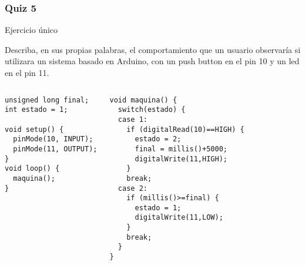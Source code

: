 \documentclass{beamer}
\begin{document}
\begin{frame}[fragile=singleslide]\frametitle{Quiz 5}

\begin{block}{Ejercicio único}
\begin{small}
Describa, en sus propias palabras, el comportamiento que un usuario observaría si utilizara un sistema basado en Arduino, con un push button en el pin 10 y un led en el pin 11.
\end{small}
\end{block}

\vspace{-0.3in}
\begin{columns}[t]

\begin{scriptsize}
\begin{verbatim}
unsigned long final;
int estado = 1;

void setup() {
  pinMode(10, INPUT);
  pinMode(11, OUTPUT);
}
void loop() {
  maquina();
}
\end{verbatim}
\end{scriptsize}

\begin{scriptsize}
\begin{verbatim}
void maquina() {
  switch(estado) {
  case 1:
  	if (digitalRead(10)==HIGH) {
  	  estado = 2;
  	  final = millis()+5000;
  	  digitalWrite(11,HIGH);
  	}
  	break;
  case 2:
    if (millis()>=final) {
      estado = 1;
      digitalWrite(11,LOW);
    }
    break;
  }  
}
\end{verbatim}
\end{scriptsize}

\end{columns}
\end{frame}
\end{document}
